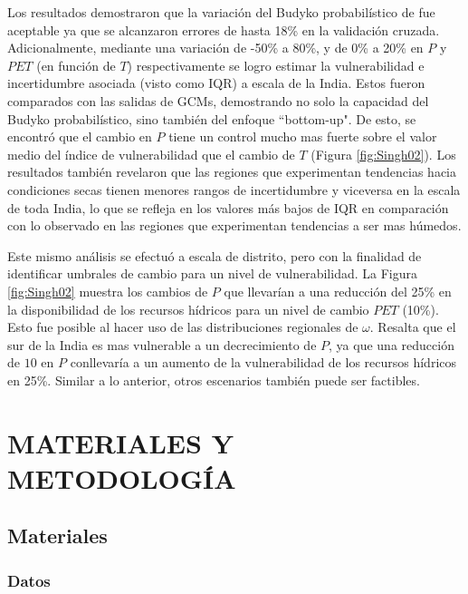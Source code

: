 \documentclass[12pt]{article}
\begin{document}
Los resultados demostraron que la variación del Budyko probabilístico de \citet{Singh2015} fue aceptable ya que se alcanzaron errores de hasta 18\% en la validación cruzada. Adicionalmente, mediante una variación de -50\% a 80\%, y de 0\% a 20\% en $P$ y $PET$ (en función de $T$) respectivamente se logro estimar la vulnerabilidad e incertidumbre asociada (visto como IQR) a escala de la India. Estos fueron comparados con las salidas de GCMs, demostrando no solo la capacidad del Budyko probabilístico, sino también del enfoque “bottom-up". De esto, se encontró que el cambio en $P$ tiene un control mucho mas fuerte sobre el valor medio del índice de vulnerabilidad que el cambio de $T$ (Figura \ref{fig:Singh02}). Los resultados también revelaron que las regiones que experimentan tendencias hacia condiciones secas tienen menores rangos de incertidumbre y viceversa en la escala de toda India, lo que se refleja en los valores más bajos de IQR en comparación con lo observado en las regiones que experimentan tendencias a ser mas húmedos.

Este mismo análisis se efectuó a escala de distrito, pero con la finalidad de identificar umbrales de cambio para un nivel de vulnerabilidad. La Figura \ref{fig:Singh02} muestra los cambios de $P$ que llevarían a una reducción del 25\% en la disponibilidad de los recursos hídricos para un nivel de cambio $PET$ (10\%). Esto fue posible al hacer uso de las distribuciones regionales de $\omega$. Resalta que el sur de la India es mas vulnerable a un decrecimiento de $P$, ya que una reducción de $10$ en $P$ conllevaría a un aumento de la vulnerabilidad de los recursos hídricos en 25\%. Similar a lo anterior, otros escenarios también puede ser factibles. 





\clearpage
\vspace*{0.5mm}
\section{MATERIALES Y METODOLOGÍA}

\subsection{Materiales}

\subsubsection{Datos}
\end{document}
